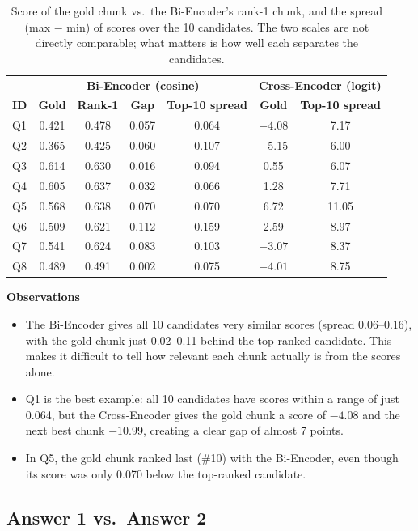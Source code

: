 \documentclass[11pt,a4paper]{article}
\newenvironment{observations}
  {\par\smallskip\noindent\textbf{Observations}\begin{itemize}}
  {\end{itemize}\smallskip}
\begin{document}
\begin{table}[H]
\centering\small
\begin{tabular}{lcccc|cc}
\toprule
 & \multicolumn{4}{c|}{\textbf{Bi-Encoder (cosine)}} & \multicolumn{2}{c}{\textbf{Cross-Encoder (logit)}} \\
\textbf{ID} & \textbf{Gold} & \textbf{Rank-1} & \textbf{Gap} & \textbf{Top-10 spread} & \textbf{Gold} & \textbf{Top-10 spread} \\
\midrule
Q1 & 0.421 & 0.478 & 0.057 & 0.064 & $-4.08$ & 7.17 \\
Q2 & 0.365 & 0.425 & 0.060 & 0.107 & $-5.15$ & 6.00 \\
Q3 & 0.614 & 0.630 & 0.016 & 0.094 & 0.55 & 6.07 \\
Q4 & 0.605 & 0.637 & 0.032 & 0.066 & 1.28 & 7.71 \\
Q5 & 0.568 & 0.638 & 0.070 & 0.070 & 6.72 & 11.05 \\
Q6 & 0.509 & 0.621 & 0.112 & 0.159 & 2.59 & 8.97 \\
\midrule
Q7 & 0.541 & 0.624 & 0.083 & 0.103 & $-3.07$ & 8.37 \\
Q8 & 0.489 & 0.491 & 0.002 & 0.075 & $-4.01$ & 8.75 \\
\bottomrule
\end{tabular}
\caption{Score of the gold chunk vs.\ the Bi-Encoder's rank-1 chunk, and the spread (max $-$ min) of
scores over the 10 candidates. The two scales are not directly comparable; what matters is how well each
separates the candidates.}
\end{table}

\begin{observations}
  \item The Bi-Encoder gives all 10 candidates very similar scores (spread 0.06--0.16), with the gold chunk just 0.02--0.11 behind the top-ranked candidate. This makes it difficult to tell how relevant each chunk actually is from the scores alone.
  \item Q1 is the best example: all 10 candidates have scores within a range of just 0.064, but the Cross-Encoder gives the gold chunk a score of $-4.08$ and the next best chunk $-10.99$, creating a clear gap of almost 7 points.
  \item In Q5, the gold chunk ranked last (\#10) with the Bi-Encoder, even though its score was only 0.070 below the top-ranked candidate.
\end{observations}

\subsection{Answer 1 vs.\ Answer 2}
\end{document}
